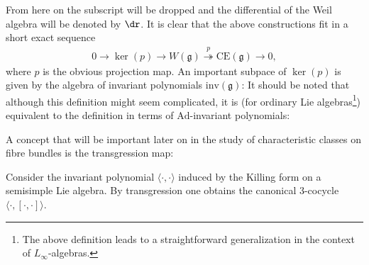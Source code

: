     From here on the subscript will be dropped and the differential of the Weil algebra will be denoted by $\dr$. It is clear that the above constructions fit in a short exact sequence
    \begin{gather}
        \label{lie:weil_algebra_sequence}
        0\rightarrow\ker(p)\rightarrow W(\mathfrak{g})\overset{p}{\twoheadrightarrow}\mathrm{CE}(\mathfrak{g})\rightarrow0,
    \end{gather}
    where $p$ is the obvious projection map. An important subpace of $\ker(p)$ is given by the algebra of invariant polynomials $\mathrm{inv}(\mathfrak{g})$:
    It should be noted that although this definition might seem complicated, it is (for ordinary Lie algebras\footnote{The above definition leads to a straightforward generalization in the context of $L_\infty$-algebras.}) equivalent to the definition in terms of $\mathrm{Ad}$-invariant polynomials:

    A concept that will be important later on in the study of characteristic classes on fibre bundles is the transgression map:
    \begin{example}\label{lie:killing_transgression}
        Consider the invariant polynomial $\langle\cdot,\cdot\rangle$ induced by the Killing form on a semisimple Lie algebra. By transgression one obtains the canonical 3-cocycle $\langle\cdot,[\cdot,\cdot]\rangle$.
    \end{example}